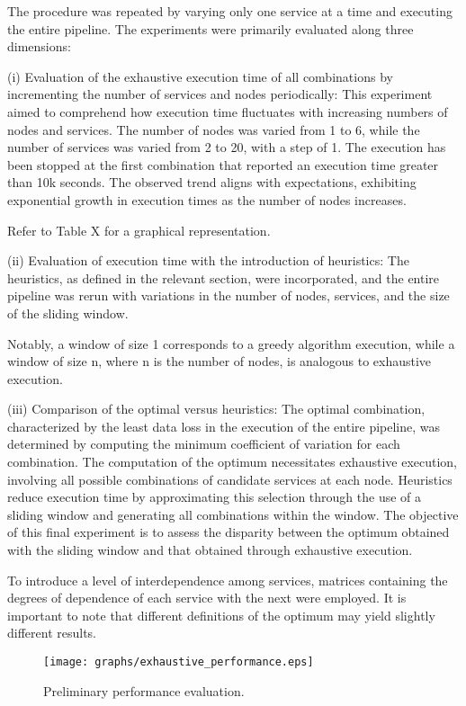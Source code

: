 The procedure was repeated by varying only one service at a time and executing the entire pipeline.
The experiments were primarily evaluated along three dimensions:

(i) Evaluation of the exhaustive execution time of all combinations by incrementing the number of services and nodes periodically:
This experiment aimed to comprehend how execution time fluctuates with increasing numbers of nodes and services.
The number of nodes was varied from 1 to 6, while the number of services was varied from 2 to 20, with a step of 1.
The execution has been stopped at the first combination that reported an execution time greater than 10k seconds.
The observed trend aligns with expectations, exhibiting exponential growth in execution times as the number of nodes increases.

Refer to Table X for a graphical representation.

(ii) Evaluation of execution time with the introduction of heuristics:
The heuristics, as defined in the relevant section, were incorporated,
and the entire pipeline was rerun with variations in the number of nodes,
services, and the size of the sliding window.

Notably, a window of size 1 corresponds to a greedy algorithm execution,
while a window of size n, where n is the number of nodes, is analogous to exhaustive execution.

(iii) Comparison of the optimal versus heuristics:
The optimal combination, characterized by the least data loss in the execution of the entire pipeline,
was determined by computing the minimum coefficient of variation for each combination.
The computation of the optimum necessitates exhaustive execution, involving all possible combinations of candidate services at each node.
Heuristics reduce execution time by approximating this selection through the use of a sliding window and generating all combinations within the window.
The objective of this final experiment is to assess the disparity between the optimum obtained with the sliding window and that obtained through exhaustive execution.

To introduce a level of interdependence among services,
matrices containing the degrees of dependence of each service with the next were employed.
It is important to note that different definitions of the optimum may yield slightly different results.

\begin{figure}
  \texttt{[image: graphs/exhaustive\_performance.eps]}
  \caption{Preliminary performance evaluation.}
  \label{fig:perf}
\end{figure}